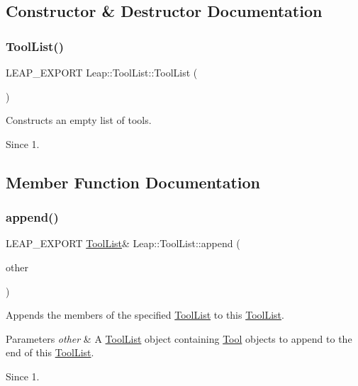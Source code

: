 \subsection{Constructor \& Destructor Documentation}
\mbox{\label{class_leap_1_1_tool_list_a3ee8e7e7b50f92b9d31ad31e7fd55c2e}} 
\subsubsection{\texorpdfstring{Tool\+List()}{ToolList()}}
{\footnotesize\ttfamily L\+E\+A\+P\+\_\+\+E\+X\+P\+O\+RT Leap\+::\+Tool\+List\+::\+Tool\+List (\begin{DoxyParamCaption}{ }\end{DoxyParamCaption})}

Constructs an empty list of tools. \begin{DoxySince}{Since}
1. 
\end{DoxySince}


\subsection{Member Function Documentation}
\mbox{\label{class_leap_1_1_tool_list_a384adf507eeb1cfacc5aaa71a38ca452}} 
\subsubsection{\texorpdfstring{append()}{append()}}
{\footnotesize\ttfamily L\+E\+A\+P\+\_\+\+E\+X\+P\+O\+RT \hyperlink{class_leap_1_1_tool_list}{Tool\+List}\& Leap\+::\+Tool\+List\+::append (\begin{DoxyParamCaption}\item[{const \hyperlink{class_leap_1_1_tool_list}{Tool\+List} \&}]{other }\end{DoxyParamCaption})}

Appends the members of the specified \hyperlink{class_leap_1_1_tool_list}{Tool\+List} to this \hyperlink{class_leap_1_1_tool_list}{Tool\+List}. 
\begin{DoxyParams}{Parameters}
{\em other} & A \hyperlink{class_leap_1_1_tool_list}{Tool\+List} object containing \hyperlink{class_leap_1_1_tool}{Tool} objects to append to the end of this \hyperlink{class_leap_1_1_tool_list}{Tool\+List}. \\
\hline
\end{DoxyParams}
\begin{DoxySince}{Since}
1. 
\end{DoxySince}
\mbox{\label{class_leap_1_1_tool_list_aed5c9b6918f7fd1d85c1e8f0b58ad7fb}} 

